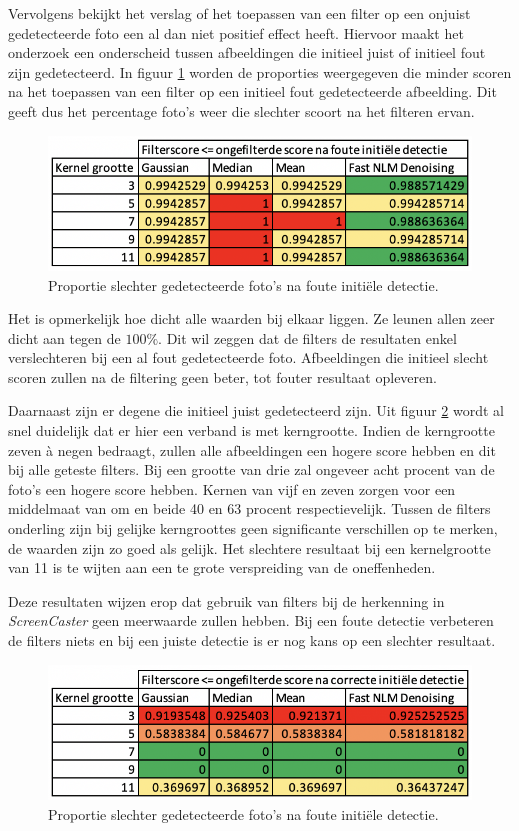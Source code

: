 Vervolgens bekijkt het verslag of het toepassen van een filter op een onjuist gedetecteerde foto een al dan niet positief effect heeft.
Hiervoor maakt het onderzoek een onderscheid tussen afbeeldingen die initieel juist of initieel fout zijn gedetecteerd. 
In figuur \ref{fig:initieelfout} worden de proporties weergegeven die minder scoren na het toepassen van een filter op een initieel fout gedetecteerde afbeelding. Dit geeft dus het percentage foto's weer die slechter scoort na het filteren ervan.

\begin{figure}[h!]
  \includegraphics{img/initieelFout}
  \caption{Proportie slechter gedetecteerde foto's na foute initiële detectie.}
  \label{fig:initieelfout}
\end{figure}

Het is opmerkelijk hoe dicht alle waarden bij elkaar liggen. Ze leunen allen zeer dicht aan tegen de $100\%$. Dit wil zeggen dat de filters de resultaten enkel verslechteren bij een al fout gedetecteerde foto. Afbeeldingen die initieel slecht scoren zullen na de filtering geen beter, tot fouter resultaat opleveren. 

Daarnaast zijn er degene die initieel juist gedetecteerd zijn. Uit figuur \ref{fig:initieeljuist} wordt al snel duidelijk dat er hier een verband is met kerngrootte. Indien de kerngrootte zeven à negen bedraagt, zullen alle afbeeldingen een hogere score hebben en dit bij alle geteste filters. Bij een grootte van drie zal ongeveer acht procent van de foto's een hogere score hebben. Kernen van vijf en zeven zorgen voor een middelmaat van om en beide 40 en 63 procent respectievelijk. Tussen de filters onderling zijn bij gelijke kerngroottes geen significante verschillen op te merken, de waarden zijn zo goed als gelijk. Het slechtere resultaat bij een kernelgrootte van 11 is te wijten aan een te grote verspreiding van de oneffenheden.

Deze resultaten wijzen erop dat gebruik van filters bij de herkenning in {\it ScreenCaster} geen meerwaarde zullen hebben. Bij een foute detectie verbeteren de filters niets en bij een juiste detectie is er nog kans op een slechter resultaat.

\begin{figure}[h!]
  \includegraphics{img/initieeljuist}
  \caption{Proportie slechter gedetecteerde foto's na foute initiële detectie.}
  \label{fig:initieeljuist}
\end{figure}